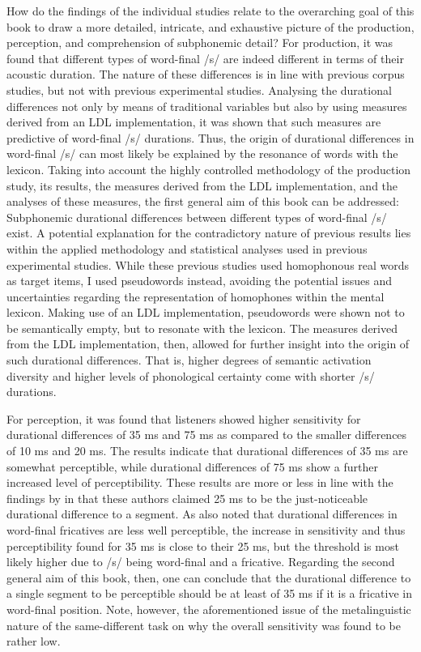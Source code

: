 How do the findings of the individual studies relate to the overarching goal of this book to draw a more detailed, intricate, and exhaustive picture of the production, perception, and comprehension of subphonemic detail? For production, it was found that different types of word-final /s/ are indeed different in terms of their acoustic duration. The nature of these differences is in line with previous corpus studies, but not with previous experimental studies. Analysing the durational differences not only by means of traditional variables but also by using measures derived from an LDL implementation, it was shown that such measures are predictive of word-final /s/ durations. Thus, the origin of durational differences in word-final /s/ can most likely be explained by the resonance of words with the lexicon. Taking into account the highly controlled methodology of the production study, its results, the measures derived from the LDL implementation, and the analyses of these measures, the first general aim of this book can be addressed: Subphonemic durational differences between different types of word-final /s/ exist. A potential explanation for the contradictory nature of previous results lies within the applied methodology and statistical analyses used in previous experimental studies. While these previous studies used homophonous real words as target items, I used pseudowords instead, avoiding the potential issues and uncertainties regarding the representation of homophones within the mental lexicon. Making use of an LDL implementation, pseudowords were shown not to be semantically empty, but to resonate with the lexicon. The measures derived from the LDL implementation, then, allowed for further insight into the origin of such durational differences. That is, higher degrees of semantic activation diversity and higher levels of phonological certainty come with shorter /s/ durations.

For perception, it was found that listeners showed higher sensitivity for durational differences of 35 ms and 75 ms as compared to the smaller differences of 10 ms and 20 ms. The results indicate that durational differences of 35 ms are somewhat perceptible, while durational differences of 75 ms show a further increased level of perceptibility. These results are more or less in line with the findings by \citet{Klatt1975} in that these authors claimed 25 ms to be the just-noticeable durational difference to a segment. As \citet{Klatt1975} also noted that durational differences in word-final fricatives are less well perceptible, the increase in sensitivity and thus perceptibility found for 35 ms is close to their 25 ms, but the threshold is most likely higher due to /s/ being word-final and a fricative. Regarding the second general aim of this book, then, one can conclude that the durational difference to a single segment to be perceptible should be at least of 35 ms if it is a fricative in word-final position. Note, however, the aforementioned issue of the metalinguistic nature of the same-different task on why the overall sensitivity was found to be rather low.


